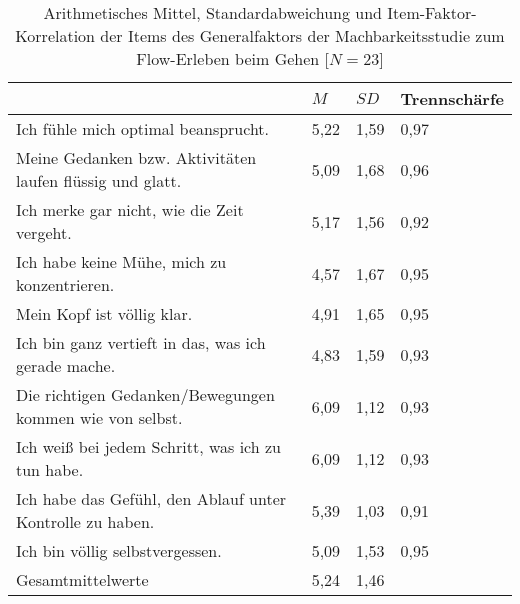 \newpage
\begin{table}
	[!htb] \centering \caption[Item-Faktor-Korrelation der Items des Generalfaktors (Machbarkeitsstudie: Gehen)]{Arithmetisches Mittel, Standardabweichung und Item-Faktor-Korrelation der Items des Generalfaktors der Machbarkeitsstudie zum Flow-Erleben beim Gehen [$N = 23$]} \label{tab:generalfaktor_2} 
	\begin{tabularx}
		{ 
		\textwidth}{p{} p{} p{} p{}} \toprule & $M$ & $SD$ & Trennschärfe \\
		\midrule Ich fühle mich optimal beansprucht. & 5,22 & 1,59 & 0,97 \\
		Meine Gedanken bzw. Aktivitäten laufen flüssig und glatt. & 5,09 & 1,68 & 0,96 \\
		Ich merke gar nicht, wie die Zeit vergeht. & 5,17 & 1,56 & 0,92 \\
		Ich habe keine Mühe, mich zu konzentrieren. & 4,57 & 1,67 & 0,95 \\
		Mein Kopf ist völlig klar. & 4,91 & 1,65 & 0,95 \\
		Ich bin ganz vertieft in das, was ich gerade mache. & 4,83 & 1,59 & 0,93 \\
		Die richtigen Gedanken/Bewegungen kommen wie von selbst. & 6,09 & 1,12 & 0,93 \\
		Ich weiß bei jedem Schritt, was ich zu tun habe. & 6,09 & 1,12 & 0,93 \\
		Ich habe das Gefühl, den Ablauf unter Kontrolle zu haben. & 5,39 & 1,03 & 0,91 \\
		Ich bin völlig selbstvergessen. & 5,09 & 1,53 & 0,95 \\
		Gesamtmittelwerte & 5,24 & 1,46 & \\
		\bottomrule 
	\end{tabularx}
\end{table}
